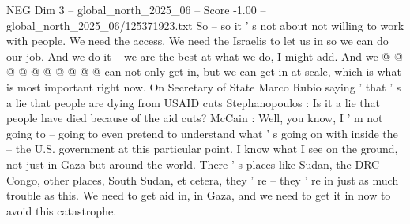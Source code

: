 \begin{textsample}{NEG Dim 3 – global\_north\_2025\_06 – Score -1.00 – global\_north\_2025\_06/125371923.txt}
So -- so it ' s not about not willing to work with people.
We need the access.
We need the Israelis to let us in so we can do our job.
And we do it -- we are the best at what we do, I might add.
And we @ @ @ @ @ @ @ @ @ @ can not only get in, but we can get in at scale, which is what is most important right now.
On Secretary of State Marco Rubio saying ' that ' s a lie that people are dying from USAID cuts Stephanopoulos : Is it a lie that people have died because of the aid cuts?
McCain : Well, you know, I ' m not going to -- going to even pretend to understand what ' s going on with inside the -- the U.S. government at this particular point.
I know what I see on the ground, not just in Gaza but around the world.
There ' s places like Sudan, the DRC Congo, other places, South Sudan, et cetera, they ' re -- they ' re in just as much trouble as this.
We need to get aid in, in Gaza, and we need to get it in now to avoid this catastrophe.

\end{textsample}
